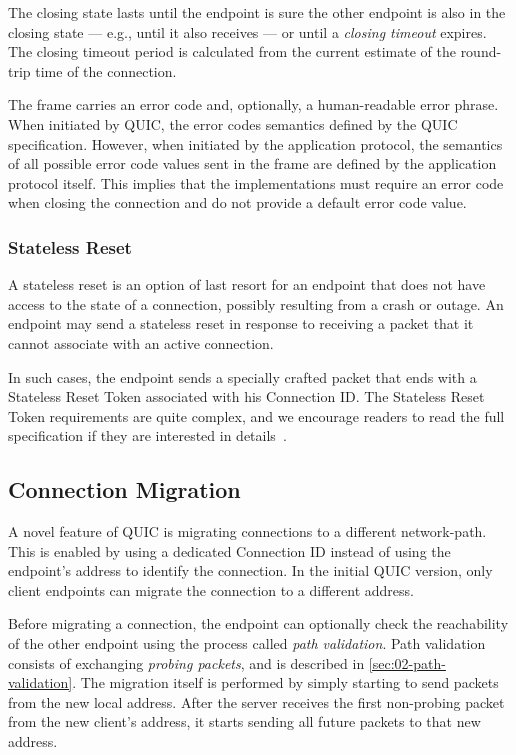 The closing state lasts until the endpoint is sure the other endpoint is also in the closing state
--- e.g., until it also receives \CONNECTIONCLOSE{} --- or until a \textit{closing timeout} expires.
The closing timeout period is calculated from the current estimate of the round-trip time of the
connection.

The \CONNECTIONCLOSE{} frame carries an error code and, optionally, a human-readable error phrase.
When initiated by QUIC, the error codes semantics defined by the QUIC specification. However, when
initiated by the application protocol, the semantics of all possible error code values sent in the
frame are defined by the application protocol itself. This implies that the implementations must
require an error code when closing the connection and do not provide a default error code value.

\subsubsection{Stateless Reset}\label{sec:02-stateless-reset}

A stateless reset is an option of last resort for an endpoint that does not have access to the state
of a connection, possibly resulting from a crash or outage. An endpoint may send a stateless reset
in response to receiving a packet that it cannot associate with an active connection.

In such cases, the endpoint sends a specially crafted packet that ends with a Stateless Reset Token
associated with his Connection ID\@. The Stateless Reset Token requirements are quite complex, and
we encourage readers to read the full specification if they are interested in
details~\cite[Section~10.4]{draft-ietf-quic-transport}.

\subsection{Connection Migration}

A novel feature of QUIC is migrating connections to a different \gls{network-path}. This is enabled
by using a dedicated Connection ID instead of using the endpoint's address to identify the
connection. In the initial QUIC version, only client endpoints can migrate the connection to a
different address.

Before migrating a connection, the endpoint can optionally check the reachability of the other
endpoint using the process called \textit{path validation}. Path validation consists of exchanging
\textit{probing packets}, and is described in \autoref{sec:02-path-validation}. The migration itself
is performed by simply starting to send packets from the new local address. After the server
receives the first non-probing packet from the new client's address, it starts sending all future
packets to that new address.

